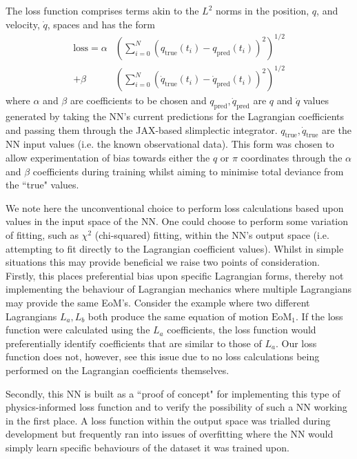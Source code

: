 \documentclass[10pt]{iopart}
\begin{document}
The loss function comprises terms akin to the $L^2$ norms in the position, $q$, and velocity, $\dot q$, spaces and has the form
\begin{equation}
\begin{split}
		\label{lossfunc}
	\textrm{loss} = \alpha&\left(\sum_{i=0}^N (q_{\textrm{true}}(t_i) - q_{\textrm{pred}}(t_i))^2\right)^{1/2} \\ +  \beta&\left(\sum_{i=0}^N (\dot{q}_{\textrm{true}}(t_i) - \dot{q}_{\textrm{pred}}(t_i))^2\right)^{1/2}
\end{split}
\end{equation}
where $\alpha$ and $\beta$ are coefficients to be chosen and $q_{\textrm{pred}}, \dot{q}_{\textrm{pred}}$ are $q$ and $\dot q$ values generated by taking the NN's current predictions for the Lagrangian coefficients and passing them through the JAX-based slimplectic integrator. $q_{\textrm{true}}, \dot{q}_{\textrm{true}}$ are the NN input values (i.e. the known observational data). This form was chosen to allow experimentation of bias towards either the $q$ or $\pi$ coordinates through the $\alpha$ and $\beta$ coefficients during training whilst aiming to minimise total deviance from the ``true" values.

We note here the unconventional choice to perform loss calculations based upon values in the input space of the NN. One could choose to perform some variation of fitting, such as $\chi^2$ (chi-squared) fitting, within the NN's output space (i.e. attempting to fit directly to the Lagrangian coefficient values). Whilst in simple situations this may provide beneficial we raise two points of consideration. Firstly, this places preferential bias upon specific Lagrangian forms, thereby not implementing the behaviour of Lagrangian mechanics where multiple Lagrangians may provide the same EoM's. Consider the example where two different Lagrangians $L_a, L_b$ both produce the same equation of motion $\textrm{EoM}_1$. If the loss function were calculated using the $L_a$ coefficients, the loss function would preferentially identify coefficients that are similar to those of $L_a$. Our loss function does not, however, see this issue due to no loss calculations being performed on the Lagrangian coefficients themselves. 

 Secondly, this NN is built as a ``proof of concept" for implementing this type of physics-informed loss function and to verify the possibility of such a NN working in the first place. A loss function within the output space was trialled during development but frequently ran into issues of overfitting where the NN would simply learn specific behaviours of the dataset it was trained upon. 
\end{document}
